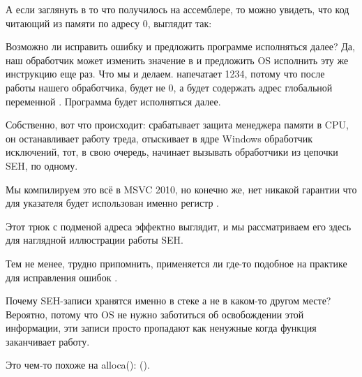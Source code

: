 А если заглянуть в то что получилось на ассемблере,
то можно увидеть, что код читающий из памяти по адресу 0, выглядит так:



Возможно ли  исправить ошибку и предложить программе исполняться далее?
Да, наш обработчик может изменить значение в \EAX и предложить \ac{OS} исполнить эту же инструкцию еще раз.
Что мы и делаем. \printf напечатает 1234, потому что после работы нашего обработчика, \EAX будет не 0,
а будет содержать адрес глобальной переменной .
Программа будет исполняться далее.

Собственно, вот что происходит: срабатывает защита менеджера памяти в \ac{CPU}, 
он останавливает работу треда, отыскивает в ядре Windows обработчик исключений, 
тот, в свою очередь, начинает вызывать обработчики из цепочки \ac{SEH}, по одному.

Мы компилируем это всё в MSVC 2010, но конечно же, нет никакой гарантии 
что для указателя будет использован именно регистр \EAX.

Этот трюк с подменой адреса эффектно выглядит, и мы рассматриваем его здесь для наглядной иллюстрации работы \ac{SEH}.

Тем не менее, трудно припомнить, применяется ли где-то подобное на практике для исправления ошибок .

Почему SEH-записи хранятся именно в стеке а не в каком-то другом месте?
Вероятно, потому что \ac{OS} не нужно заботиться об освобождении этой информации, эти записи
просто пропадают как ненужные когда функция заканчивает работу.

Это чем-то похоже на alloca(): ().

